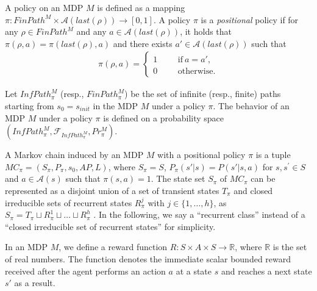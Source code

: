 \documentclass[a4j,12pt,oneside,openany,english]{jsbook}
\begin{document}
\begin{definition}[Policy]
  A policy on an MDP $M$ is defined as a mapping $\pi:FinPath^{M} \times \mathcal{A}(last(\rho)) \rightarrow [0,1]$. A policy $\pi$ is a {\it positional} policy if for any $ \rho \in FinPath^{M}$ and any $ a \in \mathcal{A}(last(\rho))$, it holds that $\pi(\rho, a)=\pi(last(\rho),a)$ and there exists $ a' \in \mathcal{A}(last(\rho))$ such that
  \begin{align*}
    \pi(\rho, a) =
    \left\{
    \begin{aligned}
      1 &   & &\text{if}\ a=a',\\
      0 &   & &\text{otherwise}.
    \end{aligned}
    \right.
  \end{align*}
\end{definition}

Let $InfPath^{M}_{\pi}$ (resp., $FinPath^{M}_{\pi}$) be the set of infinite (resp., finite) paths starting from $s_0=s_{init}$ in the MDP $M$ under a policy $\pi$. The behavior of an MDP $M$ under a policy $\pi$ is defined on a probability space $(InfPath^{M}_{\pi}, \mathcal{F}_{InfPath^{M}_{\pi}}, Pr^{M}_{\pi})$. %

\begin{definition}
  A Markov chain induced by an MDP $M$ with a positional policy $\pi$ is a tuple $MC_{\pi} = (S_{\pi},P_{\pi},s_0,AP,L)$, where $S_{\pi} = S$, $P_{\pi}(s'|s) = P(s'|s,a)$ for $s, s^{\prime} \in S$ and $a \in \mathcal{A}(s)$ such that $\pi(s,a) = 1$.
  The state set $S_{\pi}$ of $MC_{\pi}$ can be represented as a disjoint union of a set of transient states $T_{\pi}$ and closed irreducible sets of recurrent states $R^j_{\pi}$ with $j \in \{ 1, \ldots ,h \}$, as $ S_{\pi} = T_{\pi} \sqcup R^1_{\pi} \sqcup \ldots \sqcup R^h_{\pi} $ \cite{ESS}.
  In the following, we say a ``recurrent class'' instead of a ``closed irreducible set of recurrent states'' for simplicity.
\end{definition}

In an MDP $M$, we define a reward function $R:S \times A \times S \rightarrow \mathbb{R}$, where $\mathbb{R}$ is the set of real numbers. The function denotes the immediate scalar bounded reward received after the agent performs an action $a$ at a state $s$ and reaches a next state $s'$ as a result.
\end{document}
